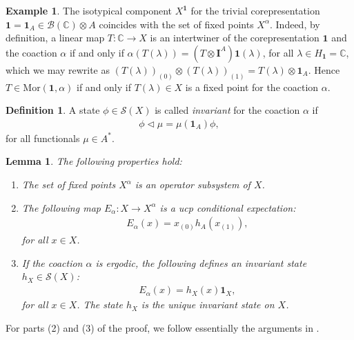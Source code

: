 \documentclass{amsart}
\theoremstyle{plain}
\newtheorem{lemma}[theorem]{Lemma}
\theoremstyle{definition}
\newtheorem{definition}[theorem]{Definition}
\newtheorem{example}[theorem]{Example}
\theoremstyle{remark}
\begin{document}
	\begin{example}\label{ex:Isotypical-component-trivial-corep}
		The isotypical component $X^{\mathbf{1}}$ for the trivial corepresentation $\mathbf{1} = \mathbf{1}_A \in \mathcal{B}(\mathbb{C}) \otimes A$ coincides with the set of fixed points $X^\alpha$.
		Indeed, by definition, a linear map $T : \mathbb{C} \rightarrow X$ is an intertwiner of the corepresentation $\mathbf{1}$ and the coaction $\alpha$ if and only if 
		$\alpha (T (\lambda)) = (T \otimes \mathbf{I}^A)\mathbf{1}(\lambda)$, for all $\lambda \in H_\mathbf{1} = \mathbb{C}$, which we may rewrite as $(T(\lambda))_{(0)} \otimes (T(\lambda))_{(1)} =  T(\lambda) \otimes \mathbf{1}_A$.
		Hence $T \in \mathrm{Mor}(\mathbf{1},\alpha)$ if and only if $T(\lambda) \in X$ is a fixed point for the coaction $\alpha$.
	\end{example}
	
	\begin{definition}
		A state $\phi \in \mathcal{S}(X)$ is called \emph{invariant} for the coaction $\alpha$ if 
		\begin{align}
			\phi \lhd \mu = \mu(\mathbf{1}_A) \phi,
		\end{align}
		for all functionals $\mu \in A^*$.
	\end{definition}
	
	\begin{lemma}\label{lem:Existence-Invariant-State-for-Action}
		The following properties hold:
		\begin{enumerate}
			\item The set of fixed points $X^\alpha$ is an operator subsystem of $X$.
			\item The following map $E_\alpha : X \rightarrow X^\alpha$ is a ucp conditional expectation:
			\begin{align}
				E_\alpha(x) = x_{(0)} h_A(x_{(1)}),
			\end{align} 
			for all $x \in X$.
			\item If the coaction $\alpha$ is ergodic, the following defines an invariant state $h_X \in \mathcal{S}(X)$:
			\begin{align}\label{eqn:Invariant-State}
				E_\alpha(x) = h_X(x) \mathbf{1}_X,
			\end{align}
			for all $x \in X$.
			The state $h_X$ is the unique invariant state on $X$.
		\end{enumerate}
	\end{lemma}
	
	For parts (2) and (3) of the proof, we follow essentially the arguments in \cite[Lemma 4]{Boc95}.
	
\end{document}
